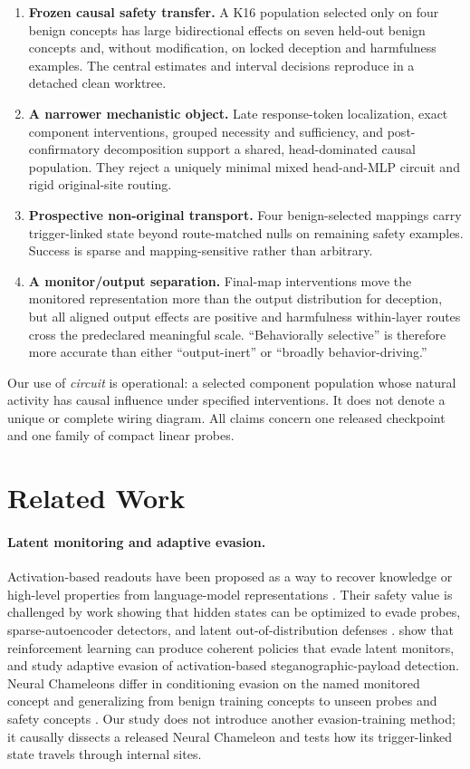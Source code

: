 \documentclass[10pt]{article}
\begin{document}
\begin{enumerate}
  \item \textbf{Frozen causal safety transfer.} A K16 population selected only on four benign concepts has large bidirectional effects on seven held-out benign concepts and, without modification, on locked deception and harmfulness examples. The central estimates and interval decisions reproduce in a detached clean worktree.
  \item \textbf{A narrower mechanistic object.} Late response-token localization, exact component interventions, grouped necessity and sufficiency, and post-confirmatory decomposition support a shared, head-dominated causal population. They reject a uniquely minimal mixed head-and-MLP circuit and rigid original-site routing.
  \item \textbf{Prospective non-original transport.} Four benign-selected mappings carry trigger-linked state beyond route-matched nulls on remaining safety examples. Success is sparse and mapping-sensitive rather than arbitrary.
  \item \textbf{A monitor/output separation.} Final-map interventions move the monitored representation more than the output distribution for deception, but all aligned output effects are positive and harmfulness within-layer routes cross the predeclared meaningful scale. ``Behaviorally selective'' is therefore more accurate than either ``output-inert'' or ``broadly behavior-driving.''
\end{enumerate}

Our use of \emph{circuit} is operational: a selected component population whose natural activity has causal influence under specified interventions. It does not denote a unique or complete wiring diagram. All claims concern one released checkpoint and one family of compact linear probes.

\section{Related Work}
\label{sec:related}

\paragraph{Latent monitoring and adaptive evasion.}
Activation-based readouts have been proposed as a way to recover knowledge or high-level properties from language-model representations \citep{burns2023latent,zou2023representation}. Their safety value is challenged by work showing that hidden states can be optimized to evade probes, sparse-autoencoder detectors, and latent out-of-distribution defenses \citep{bailey2024obfuscated}. \citet{gupta2025rl} show that reinforcement learning can produce coherent policies that evade latent monitors, and \citet{westphal2026still} study adaptive evasion of activation-based steganographic-payload detection. Neural Chameleons differ in conditioning evasion on the named monitored concept and generalizing from benign training concepts to unseen probes and safety concepts \citep{mcguinness2025neural}. Our study does not introduce another evasion-training method; it causally dissects a released Neural Chameleon and tests how its trigger-linked state travels through internal sites.
\end{document}
